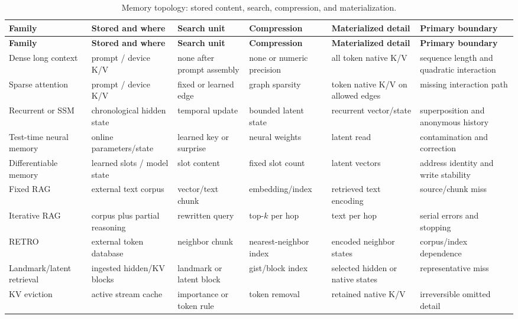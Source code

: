 \documentclass[10pt,a4paper]{article}
\begin{document}
\begingroup
\small
\setlength{\tabcolsep}{3pt}
\begin{longtable}{>{\raggedright\arraybackslash}p{2.5cm}>{\raggedright\arraybackslash}p{2.6cm}>{\raggedright\arraybackslash}p{2.4cm}>{\raggedright\arraybackslash}p{2.4cm}>{\raggedright\arraybackslash}p{2.5cm}>{\raggedright\arraybackslash}p{2.6cm}}
\caption{Memory topology: stored content, search, compression, and materialization.}
\label{tab:memory-topology}\\
\toprule
\textbf{Family} & \textbf{Stored and where} & \textbf{Search unit} & \textbf{Compression} & \textbf{Materialized detail} & \textbf{Primary boundary}\\\midrule
\endfirsthead
\toprule
\textbf{Family} & \textbf{Stored and where} & \textbf{Search unit} & \textbf{Compression} & \textbf{Materialized detail} & \textbf{Primary boundary}\\\midrule
\endhead
Dense long context & prompt / device K/V & none after prompt assembly & none or numeric precision & all token native K/V & sequence length and quadratic interaction\\
Sparse attention & prompt / device K/V & fixed or learned edge & graph sparsity & token native K/V on allowed edges & missing interaction path\\
Recurrent or SSM & chronological hidden state & temporal update & bounded latent state & recurrent vector/state & superposition and anonymous history\\
Test-time neural memory & online parameters/state & learned key or surprise & neural weights & latent read & contamination and correction\\
Differentiable memory & learned slots / model state & slot content & fixed slot count & latent vectors & address identity and write stability\\
Fixed RAG & external text corpus & vector/text chunk & embedding/index & retrieved text encoding & source/chunk miss\\
Iterative RAG & corpus plus partial reasoning & rewritten query & top-$k$ per hop & text per hop & serial errors and stopping\\
RETRO & external token database & neighbor chunk & nearest-neighbor index & encoded neighbor states & corpus/index dependence\\
Landmark/latent retrieval & ingested hidden/KV blocks & landmark or latent block & gist/block index & selected hidden or native states & representative miss\\
KV eviction & active stream cache & importance or token rule & token removal & retained native K/V & irreversible omitted detail\\

\end{longtable}
\end{document}
